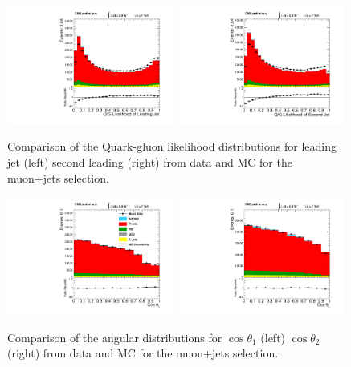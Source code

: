 \begin{figure}[h!t]
  {\centering
    \includegraphics[width=0.49\textwidth]{plots/2012_DataMC/mu_jetld_qgl.pdf}
    \includegraphics[width=0.49\textwidth]{plots/2012_DataMC/mu_jetnt_qgl.pdf}
    \caption{Comparison of the Quark-gluon likelihood distributions for leading jet (left)
    second leading (right) from data and MC for the muon+jets selection.}
\label{fig:mu_jet_qgl}}
\end{figure}
\begin{figure}[h!t]
  {\centering
    \includegraphics[width=0.49\textwidth]{plots/2012_DataMC/mu_ha.pdf}
    \includegraphics[width=0.49\textwidth]{plots/2012_DataMC/mu_hb.pdf}
    \caption{Comparison of the angular distributions for $\cos\theta_{1}$ (left)
   $\cos\theta_{2}$ (right) from data and MC for the muon+jets selection.}
\label{fig:mu_theta}}
\end{figure}
